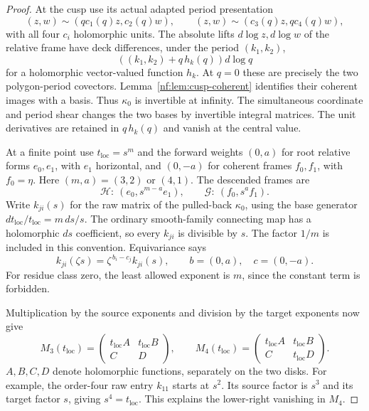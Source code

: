 \begin{proof}
At the cusp use its actual adapted period presentation
\[
 (z,w)\sim(qc_1(q)z,c_2(q)w),\qquad
 (z,w)\sim(c_3(q)z,qc_4(q)w),
\]
with all four $c_i$ holomorphic units.
The absolute lifts $d\log z,d\log w$ of the relative frame
have deck differences, under the period $(k_1,k_2)$,
\[
 \left((k_1,k_2)+q\,h_k(q)\right)d\log q
\]
for a holomorphic vector-valued function $h_k$.
At $q=0$ these are precisely the two polygon-period
covectors. Lemma~\ref{nf:lem:cusp-coherent} identifies their
coherent images with a basis. Thus $\kappa_0$ is invertible
at infinity. The simultaneous coordinate and period shear
changes the two bases by invertible integral matrices.
The unit derivatives are retained in $q\,h_k(q)$ and
vanish at the central value.

At a finite point use $t_{\mathrm{loc}}=s^m$ and the forward
weights $(0,a)$ for root relative forms $e_0,e_1$, with
$e_1$ horizontal, and $(0,-a)$ for coherent frames $f_0,f_1$,
with $f_0=\eta$. Here $(m,a)=(3,2)$ or $(4,1)$.
The descended frames are
\[
 \mathcal H:\ (e_0,s^{m-a}e_1),\qquad
 \mathcal G:\ (f_0,s^af_1).
\]
Write $k_{ji}(s)$ for the raw matrix of the pulled-back
$\kappa_0$, using the base generator
$dt_{\mathrm{loc}}/t_{\mathrm{loc}}=m\,ds/s$.
The ordinary smooth-family connecting map has a holomorphic
$ds$ coefficient, so every $k_{ji}$ is divisible by $s$.
The factor $1/m$ is included in this convention.
Equivariance says
\begin{equation}\label{hr:eq:KS-weights}
 k_{ji}(\zeta s)=\zeta^{\,b_i-c_j}k_{ji}(s),
 \qquad b=(0,a),\quad c=(0,-a).
\end{equation}
For residue class zero, the least allowed exponent is $m$,
since the constant term is forbidden.

Multiplication by the source exponents and division by the
target exponents now give
\begin{equation}\label{hr:eq:finite-KS-matrices}
 M_3(t_{\mathrm{loc}})
  =\begin{pmatrix}t_{\mathrm{loc}}A&t_{\mathrm{loc}}B\\ C&D\end{pmatrix},
 \qquad
 M_4(t_{\mathrm{loc}})
  =\begin{pmatrix}t_{\mathrm{loc}}A&t_{\mathrm{loc}}B\\
                       C&t_{\mathrm{loc}}D\end{pmatrix}.
\end{equation}
$A,B,C,D$ denote holomorphic functions, separately on
the two disks. For example, the order-four raw entry
$k_{11}$ starts at $s^2$. Its source factor is $s^3$
and its target factor $s$, giving $s^4=t_{\mathrm{loc}}$.
This explains the lower-right vanishing in $M_4$.


\end{proof}
